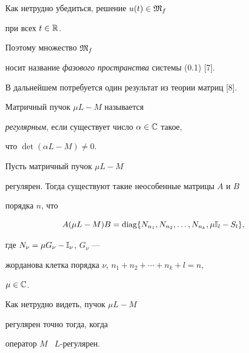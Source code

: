 \begin{notes}


Как нетрудно убедиться, решение $u(t)\in {\frak M}_f$


при всех $t\in{\Bbb R}$.


Поэтому множество ${\frak M}_f$


носит название {\it фазового пространства} системы (0.1) [7].


\end{notes}





В дальнейшем потребуется один результат из теории матриц [8].





\begin{defns}


Матричный пучок $\mu L - M$ называется


{\it регулярным}, если существует число $\alpha\in{\Bbb C}$ такое,


что $\det(\alpha L - M)\neq 0$.


\end{defns}





\begin{thms}


Пусть матричный пучок $\mu L - M$


регулярен. Тогда существуют такие неособенные матрицы $A$ и $B$


порядка $n$, что


$$


A(\mu L - M) B =


\diag \{N_{n_1}, N_{n_2},\dotsc, N_{n_k}, \mu{\Bbb I}_l -S_l\},


$$


где $N_\nu = \mu G_\nu - {\Bbb I}_\nu$, $G_\nu$ ---


жорданова клетка порядка $\nu$, $n_1 + n_2 + \dotsb + n_k + l =n$,


$\mu\in{\Bbb C}$.


\end{thms}





\begin{notes}


Как нетрудно видеть, пучок $\mu L - M$


регулярен точно тогда, когда


оператор $M$ \ $L$-регулярен.


\end{notes}








